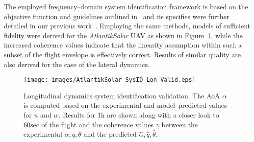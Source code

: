 The employed frequency--domain system identification framework is based on the objective function and guidelines outlined in~\cite{TISCHLER_BOOK} and its specifies were further detailed in our previous work~\cite{Oettershagen_MED14_L1MPC}. Employing the same methods, models of sufficient fidelity were derived for the \textit{AtlantikSolar} UAV as shown in Figure~\ref{SysID_LonValid}, while the increased coherence values indicate that the linearity assumption within such a subset of the flight envelope is effectively correct. Results of similar quality are also derived for the case of the lateral dynamics. 

%
\begin{figure}[htbp]
\centering
  \texttt{[image: images/AtlantikSolar\_SysID\_Lon\_Valid.eps]}
\caption{Longitudinal dynamics system identification validation. The AoA $\alpha$ is computed based on the experimental and model--predicted values for $u$ and $w$. Results for $1\textrm{h}$ are shown along with a closer look to $60\textrm{sec}$ of the flight and the coherence values $\gamma$ between the experimental $\alpha,q,\theta$ and the predicted $\hat{\alpha},\hat{q},\hat{\theta}$. }
\label{SysID_LonValid}
\end{figure}
% 